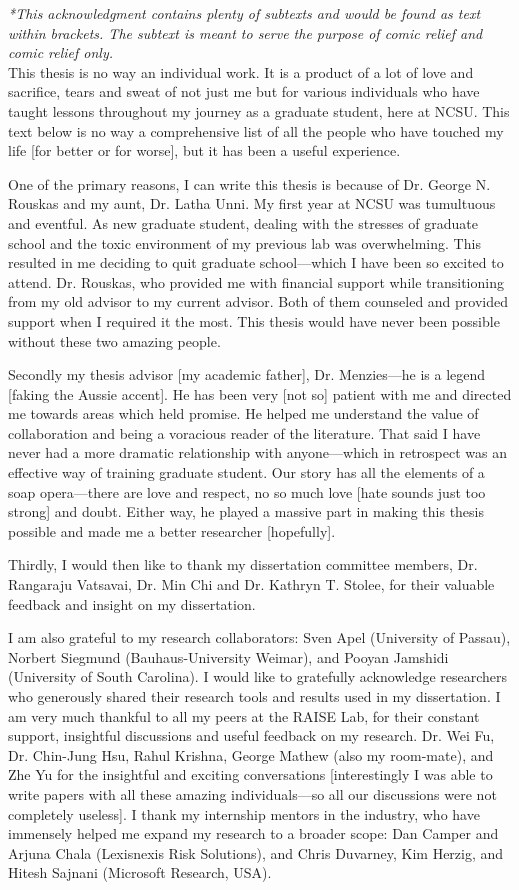 \textit{*This acknowledgment contains plenty of subtexts and would be found as text within brackets. The subtext is meant to serve the purpose of comic relief and comic relief only.} \\

This thesis is no way an individual work. It is a product of a lot of love and sacrifice, tears and sweat of not just me but for various individuals who have taught lessons throughout my journey as a graduate student, here at NCSU. This text below is no way a comprehensive list of all the people who have touched my life [for better or for worse], but it has been a useful experience. 

One of the primary reasons, I can write this thesis is because of Dr. George N. Rouskas and my aunt, Dr. Latha Unni. 
My first year at NCSU was tumultuous and eventful. As new graduate student, dealing with the stresses of graduate school and the toxic environment of my previous lab was overwhelming. This resulted in me deciding to quit graduate school---which I have been so excited to attend. Dr. Rouskas, who provided me with financial support while transitioning from my old advisor to my current advisor. Both of them counseled and provided support when I required it the most. This thesis would have never been possible without these two amazing people. 

Secondly my thesis advisor [my academic father], Dr. Menzies---he is a legend [faking the Aussie accent]. He has been very [not so] patient with me and directed me towards
areas which held promise. He helped me understand the value of collaboration and being a voracious reader of the literature. 
That said I have never had a more dramatic relationship with anyone---which in retrospect was an effective way of training graduate student. Our story has all the elements of a soap opera---there are love and respect,  no so much love [hate sounds just too strong] and doubt. Either way, he played a massive part in making this thesis possible and made me a better researcher [hopefully]. 

Thirdly, I would then like to thank my dissertation committee members,
Dr. Rangaraju Vatsavai, Dr. Min Chi and Dr. Kathryn T. Stolee,
for their valuable feedback and insight on my dissertation.

I am also grateful to my research collaborators: Sven Apel (University of Passau), Norbert Siegmund (Bauhaus-University Weimar), and Pooyan Jamshidi (University of South Carolina).  I would like to gratefully acknowledge researchers who generously shared their research tools and results used in my dissertation.  I am very much
thankful to all my peers at the RAISE Lab, for their constant support, insightful discussions and useful feedback on
my research. Dr. Wei Fu, Dr. Chin-Jung Hsu, Rahul Krishna, George Mathew (also my room-mate), and Zhe Yu for the insightful and exciting conversations [interestingly I was able to write papers with all these amazing individuals---so all our discussions were not completely useless]. 
I thank my internship mentors in the industry, who have immensely helped me expand
my research to a broader scope: Dan Camper and Arjuna Chala (Lexisnexis Risk Solutions), and Chris Duvarney, Kim Herzig, and Hitesh Sajnani (Microsoft Research, USA). 


